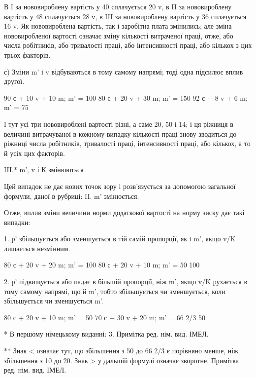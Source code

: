 В І за нововироблену вартість у 40 сплачується 20 v, в II
за нововироблену вартість у 48 сплачується 28 v, в III за нововироблену
вартість у 36 сплачується 16 v. Як нововироблена
вартість, так і заробітна плата змінились; але зміна нововиробленої
вартості означає зміну кількості витраченої праці, отже,
або числа робітників, або тривалості праці, або інтенсивності
праці, або кількох з цих трьох факторів.

с) Зміни m' і v відбуваються в тому самому напрямі; тоді
одна підсилює вплив другої.

90 с + 10 v + 10 m; m' = 100%
80 с + 20 v + 30 m; m' = 150%
92 с + 8 v + 6 m; m' = 75%

І тут усі три нововироблені вартості різні, а саме 20, 50 і 14;
і ця ріжниця в величині витрачуваної в кожному випадку кількості
праці знову зводиться до ріжниці числа робітників, тривалості
праці, інтенсивності праці, або кількох, а то й усіх цих факторів.

III.* m', v і К змінюються

Цей випадок не дає нових точок зору і розв’язується за допомогою
загальної формули, даної в рубриці: II. m' змінюється.

Отже, вплив зміни величини норми додаткової вартості на
норму зиску дає такі випадки:

1. р' збільшується або зменшується в тій самій пропорції, як
i m', якщо v/K  лишається незмінним.

80 с + 20 v + 20 m; m' = 100%
80 с + 20 v + 10 m; m' = 50%
100%

2. р' підвищується або падає в більшій пропорції, ніж m',
якщо v/K рухається в тому самому напрямі, що й m', тобто
збільшується чи зменшується, коли збільшується чи зменшується
m'.

80 с + 20 v + 10 m; m' = 50%
70 с + 30 v + 20 m; m' = 66 2/3%
50%

* В першому німецькому виданні: 3. Примітка ред. нім. вид. ІМЕЛ.

** Знак < означає тут, що збільшення з 50 до 66 2/3 є порівняно менше, ніж
збільшення з 10 до 20. Знак > у дальшій формулі означає зворотне. Примітка
ред. нім. вид. ІМЕЛ.
